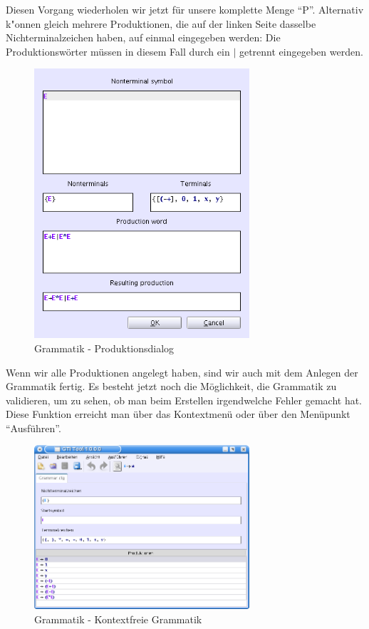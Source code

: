 Diesen Vorgang wiederholen wir jetzt für unsere komplette Menge "`P"'.
Alternativ k"onnen gleich mehrere Produktionen, die auf der linken Seite dasselbe
Nichterminalzeichen haben, auf einmal eingegeben werden: Die Produktionswörter müssen
in diesem Fall durch ein $\vert$ getrennt eingegeben werden. \vspace{10pt}

\newpage

\begin{figure}[h]
\begin{center}
\includegraphics[width=8cm]{../images/production_dialog_multi.png}
\caption{Grammatik - Produktionsdialog}
\end{center}
\end{figure}

Wenn wir alle Produktionen angelegt haben, sind wir auch mit dem Anlegen der Grammatik
fertig. Es besteht jetzt noch die Möglichkeit, die Grammatik zu validieren, um
zu sehen, ob man beim Erstellen irgendwelche Fehler gemacht hat. Diese Funktion
erreicht man über das Kontextmenü oder über den Menüpunkt "`Ausführen"'.

\begin{figure}[h]
\begin{center}
\includegraphics[width=8cm]{../images/cfg_example.png}
\caption{Grammatik - Kontextfreie Grammatik}
\end{center}
\end{figure}

